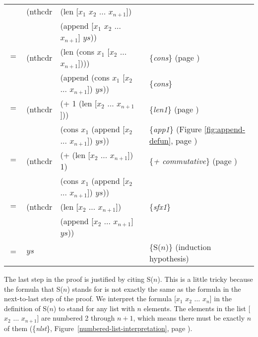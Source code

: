 \begin{center}
\begin{tabular}{llll}
    & \textsf{(nthcdr} & \textsf{(len [$x_1$ $x_2$ $\dots$ $x_{n+1}$])}                 & \\
    &         & \textsf{(append [$x_1$ $x_2$ $\dots$ $x_{n+1}$] $ys$))}        & \\
$=$ & \textsf{(nthcdr} & \textsf{(len (cons $x_1$ [$x_2$ $\dots$ $x_{n+1}$])))}         & \{\emph{cons}\} (page \pageref{first-rest-cons}) \\
    &         & \textsf{(append (cons $x_1$ [$x_2$ $\dots$ $x_{n+1}$]) $ys$))} & \{\emph{cons}\}                                \\
$=$ & \textsf{(nthcdr} & \textsf{(+ 1 (len [$x_2$ $\dots$ $x_{n+1}$]))}                 & \{\emph{len1}\} (page \pageref{len-equations})       \\
    &         & \textsf{(cons $x_1$ (append [$x_2$ $\dots$ $x_{n+1}$]) $ys$))} & \{\emph{app1}\} (Figure \ref{fig:append-defun}, page \pageref{fig:append-defun})\\
$=$ & \textsf{(nthcdr} & \textsf{(+ (len [$x_2$ $\dots$ $x_{n+1}$]) 1)}                 & \{\emph{+ commutative}\} (page \pageref{fig-02-01})  \\
    &         & \textsf{(cons $x_1$ (append [$x_2$ $\dots$ $x_{n+1}$]) $ys$))} &                                                      \\
$=$ & \textsf{(nthcdr} & \textsf{(len [$x_2$ $\dots$ $x_{n+1}$])}                       & \{\emph{sfx1}\}                                      \\
    &         & \textsf{(append [$x_2$ $\dots$ $x_{n+1}$] $ys$))}              &                                                      \\
$=$ & $ys$    &                                                     & \{S($n$)\} (induction hypothesis)\\
\end{tabular}
\end{center}

The last step in the proof is justified by citing S($n$).
This is a little tricky because the formula that S($n$)
stands for is not exactly the same as the formula in the next-to-last step of the proof.
We interpret the formula \textsf{[$x_1$ $x_2$ $\dots$ $x_n$]} in the definition of S($n$)
to stand for any list with $n$ elements.
The elements in the list \textsf{[$x_2$ $\dots$ $x_{n+1}$] }are numbered 2 through $n+1$,
which means there must be exactly $n$ of them
(\{\emph{nlst}\}, Figure~\ref{numbered-list-interpretation}, page \pageref{numbered-list-interpretation}).


